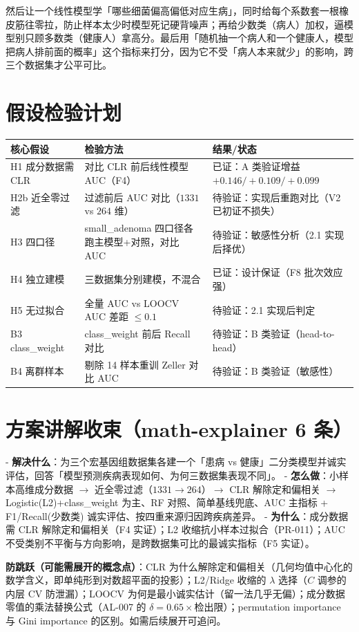 \documentclass{internal-report}
\begin{document}
然后让一个线性模型学「哪些细菌偏高偏低对应生病」，同时给每个系数套一根橡皮筋往零拉，防止样本太少时模型死记硬背噪声；再给少数类（病人）加权，逼模型别只顾多数类（健康人）拿高分。最后用「随机抽一个病人和一个健康人，模型把病人排前面的概率」这个指标来打分，因为它不受「病人本来就少」的影响，跨三个数据集才公平可比。

\section{假设检验计划}

\begin{center}
\footnotesize
\begin{tabular}{p{3.4cm}p{5.0cm}p{5.0cm}}
\toprule
核心假设 & 检验方法 & 结果/状态 \\
\midrule
H1 成分数据需 CLR & 对比 CLR 前后线性模型 AUC（F4） & 已证：A 类验证增益 $+0.146/+0.109/+0.099$ \\
H2b 近全零过滤 & 过滤前后 AUC 对比（$1331$ vs $264$ 维） & 待验证：实现后重跑对比（V2 已初证不损失） \\
H3 四口径 & small\_adenoma 四口径各跑主模型+对照，对比 AUC & 待验证：敏感性分析（2.1 实现后择优） \\
H4 独立建模 & 三数据集分别建模，不混合 & 已证：设计保证（F8 批次效应强） \\
H5 无过拟合 & 全量 AUC vs LOOCV AUC 差距 $\le 0.1$ & 待验证：2.1 实现后判定 \\
B3 class\_weight & class\_weight 前后 Recall 对比 & 待验证：B 类验证（head-to-head） \\
B4 离群样本 & 剔除 14 样本重训 Zeller 对比 AUC & 待验证：B 类验证（敏感性） \\
\bottomrule
\end{tabular}
\end{center}

\section{方案讲解收束（math-explainer 6 条）}

- \textbf{解决什么}：为三个宏基因组数据集各建一个「患病 vs 健康」二分类模型并诚实评估，回答「模型预测疾病表现如何、为何三数据集表现不同」。
- \textbf{怎么做}：小样本高维成分数据 $\to$ 近全零过滤（$1331\to264$）$\to$ CLR 解除定和偏相关 $\to$ Logistic(L2)+class\_weight 为主、RF 对照、简单基线兜底、AUC 主指标 + F1/Recall(少数类) 诚实评估、按四重来源归因跨疾病差异。
- \textbf{为什么}：成分数据需 CLR 解除定和偏相关（F4 实证）；L2 收缩抗小样本过拟合（PR-011）；AUC 不受类别不平衡与方向影响，是跨数据集可比的最诚实指标（F5 实证）。

\textbf{防跳跃（可能需展开的概念点）}：CLR 为什么解除定和偏相关（几何均值中心化的数学含义，即单纯形到对数超平面的投影）；L2/Ridge 收缩的 $\lambda$ 选择（$C$ 调参的内层 CV 防泄漏）；LOOCV 为何是最小诚实估计（留一法几乎无偏）；成分数据零值的乘法替换公式（AL-007 的 $\delta=0.65\times$检出限）；permutation importance 与 Gini importance 的区别。如需后续展开可追问。
\end{document}
